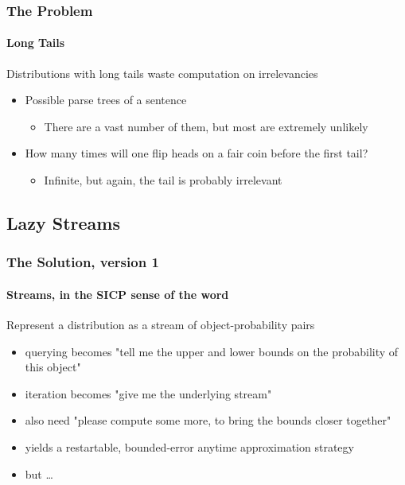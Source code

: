 \documentclass{beamer}
\begin{document}
\begin{frame}
  \frametitle{The Problem}
  \framesubtitle{Long Tails}

  Distributions with long tails waste computation on irrelevancies
  \begin{itemize}
  \item Possible parse trees of a sentence
    \begin{itemize}
    \item There are a vast number of them, but most are extremely unlikely
    \end{itemize}
  \item How many times will one flip heads on a fair coin before the first tail?
    \begin{itemize}
    \item Infinite, but again, the tail is probably irrelevant
    \end{itemize}
  \end{itemize}
\end{frame}

\subsection{Lazy Streams}

\begin{frame}
  \frametitle{The Solution, version 1}
  \framesubtitle{Streams, in the SICP sense of the word}

  Represent a distribution as a \alert{stream} of object-probability
  pairs
  \begin{itemize}
  \item querying becomes "tell me the upper and lower bounds on the
  probability of this object"
  \item iteration becomes "give me the underlying stream"
  \item also need "please compute some more, to bring the bounds closer together"
  \item yields a restartable, bounded-error anytime approximation strategy
  \item but \ldots
  \end{itemize}

\end{frame}
\end{document}
